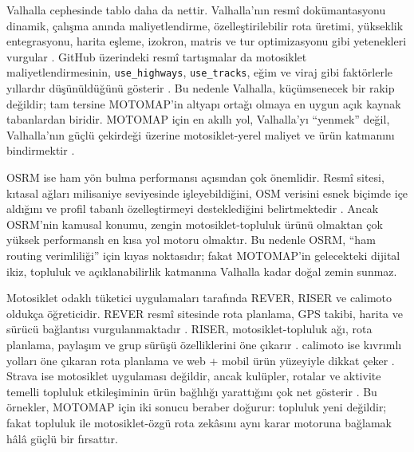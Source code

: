 \documentclass[11pt,a4paper]{article}
\begin{document}
Valhalla cephesinde tablo daha da nettir. Valhalla'nın resmî dokümantasyonu dinamik, çalışma anında maliyetlendirme, özelleştirilebilir rota üretimi, yükseklik entegrasyonu, harita eşleme, izokron, matris ve tur optimizasyonu gibi yetenekleri vurgular \cite{o7,o8,o9,o10,o11,o12}. GitHub üzerindeki resmî tartışmalar da motosiklet maliyetlendirmesinin, \texttt{use\_highways}, \texttt{use\_tracks}, eğim ve viraj gibi faktörlerle yıllardır düşünüldüğünü gösterir \cite{o13}. Bu nedenle Valhalla, küçümsenecek bir rakip değildir; tam tersine MOTOMAP'in altyapı ortağı olmaya en uygun açık kaynak tabanlardan biridir. MOTOMAP için en akıllı yol, Valhalla'yı ``yenmek'' değil, Valhalla'nın güçlü çekirdeği üzerine motosiklet-yerel maliyet ve ürün katmanını bindirmektir \cite{g6}.

OSRM ise ham yön bulma performansı açısından çok önemlidir. Resmî sitesi, kıtasal ağları milisaniye seviyesinde işleyebildiğini, OSM verisini esnek biçimde içe aldığını ve profil tabanlı özelleştirmeyi desteklediğini belirtmektedir \cite{o14}. Ancak OSRM'nin kamusal konumu, zengin motosiklet-topluluk ürünü olmaktan çok yüksek performanslı en kısa yol motoru olmaktır. Bu nedenle OSRM, ``ham routing verimliliği'' için kıyas noktasıdır; fakat MOTOMAP'in gelecekteki dijital ikiz, topluluk ve açıklanabilirlik katmanına Valhalla kadar doğal zemin sunmaz.

Motosiklet odaklı tüketici uygulamaları tarafında REVER, RISER ve calimoto oldukça öğreticidir. REVER resmî sitesinde rota planlama, GPS takibi, harita ve sürücü bağlantısı vurgulanmaktadır \cite{o15}. RISER, motosiklet-topluluk ağı, rota planlama, paylaşım ve grup sürüşü özelliklerini öne çıkarır \cite{o16}. calimoto ise kıvrımlı yolları öne çıkaran rota planlama ve web + mobil ürün yüzeyiyle dikkat çeker \cite{o17}. Strava ise motosiklet uygulaması değildir, ancak kulüpler, rotalar ve aktivite temelli topluluk etkileşiminin ürün bağlılığı yarattığını çok net gösterir \cite{o18}. Bu örnekler, MOTOMAP için iki sonucu beraber doğurur: topluluk yeni değildir; fakat topluluk ile motosiklet-özgü rota zekâsını aynı karar motoruna bağlamak hâlâ güçlü bir fırsattır.
\end{document}
